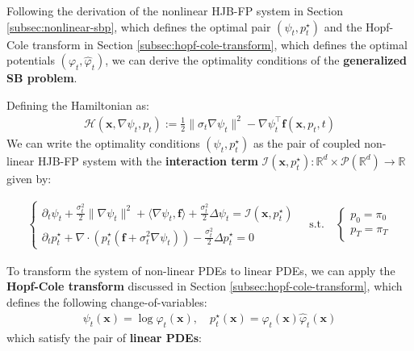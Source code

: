 \documentclass{article}
\begin{document}
Following the derivation of the nonlinear HJB-FP system in Section \ref{subsec:nonlinear-sbp}, which defines the optimal pair $(\psi_t, p^\star_t)$ and the Hopf-Cole transform in Section \ref{subsec:hopf-cole-transform}, which defines the optimal potentials $(\varphi_t,\hat\varphi_t)$, we can derive the optimality conditions of the \textbf{generalized SB problem}.

\begin{definition}\label{def:optimality-generalized-sbp}
    Defining the Hamiltonian as:
    \begin{align}
        \mathcal{H}(\boldsymbol{x}, \nabla \psi_t, p_t):=\frac{1}{2}\|\sigma_t\nabla \psi_t\|^2-\nabla \psi_t^{\top}\boldsymbol{f}(\boldsymbol{x}, p_t, t)
    \end{align}
    We can write the optimality conditions $(\psi_t, p^\star_t)$ as the pair of coupled non-linear HJB-FP system with the \textbf{interaction term} $\mathcal{I}(\boldsymbol{x},p_t^\star):\mathbb{R}^d\times \mathcal{P}(\mathbb{R}^d)\to \mathbb{R}$ given by:
    \begin{small}
    \begin{align}
        \begin{cases}
        \partial_t \psi_t+\frac{\sigma_t^2}{2}\|\nabla \psi_t\|^2+\langle\nabla \psi_t, \boldsymbol{f}\rangle +\frac{\sigma_t^2}{2}\Delta \psi_t=\mathcal{I}(\boldsymbol{x},p^\star_t)\\
        \partial_t p^\star_t+\nabla \cdot (p_t^\star (\boldsymbol{f}+\sigma_t^2\nabla \psi_t))-\frac{\sigma_t^2}{2}\Delta p_t^\star=0
    \end{cases}\quad \text{s.t.}\quad 
    \begin{cases}
        p_0 =\pi_0\\
        p_T =\pi_T
    \end{cases}\label{eq:generalized-sbp-pdes}
    \end{align}
    \end{small}
    To transform the system of non-linear PDEs to linear PDEs, we can apply the \textbf{Hopf-Cole transform} discussed in Section \ref{subsec:hopf-cole-transform}, which defines the following change-of-variables:
    \begin{align}
        \psi_t(\boldsymbol{x})=\log \varphi_t(\boldsymbol{x}),\quad p^\star_t(\boldsymbol{x})=\varphi_t(\boldsymbol{x}) \hat\varphi_t(\boldsymbol{x})
    \end{align}
    which satisfy the pair of \textbf{linear PDEs}:

\end{definition}
\end{document}

